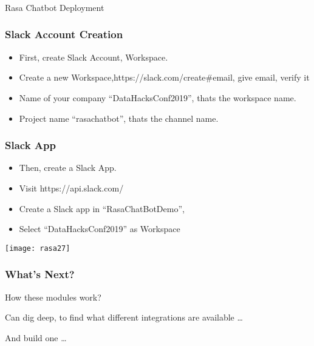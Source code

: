 \begin{frame}[fragile]\frametitle{}
\begin{center}
{\Large Rasa Chatbot Deployment}

\end{center}
\end{frame}

\begin{frame}[fragile]\frametitle{Slack Account Creation}
\begin{itemize}
\item First, create Slack Account, Workspace.
\item Create a new Workspace,https://slack.com/create#email, give email, verify it
\item Name of your company ``DataHacksConf2019'', thats the workspace name.
\item Project name ``rasachatbot'', thats the channel name.
\end{itemize}

\end{frame}

\begin{frame}[fragile]\frametitle{Slack App}
\begin{itemize}
\item Then, create a Slack App.
\item Visit https://api.slack.com/
\item Create a Slack app in ``RasaChatBotDemo'', 
\item Select ``DataHacksConf2019'' as Workspace
\end{itemize}

\begin{center}
\texttt{[image: rasa27]}
\end{center}
\end{frame}

\begin{frame}[fragile]\frametitle{What's Next?}
How these modules work? 

Can dig deep, to find what different integrations are available \ldots

And build one \ldots

\end{frame}
